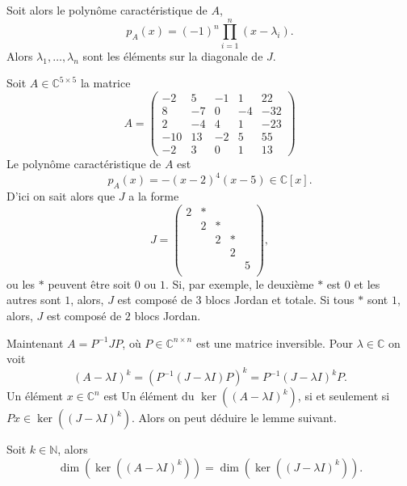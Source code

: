 \noindent 
Soit  alors le polynôme caractéristique de $A$, 
\begin{equation}
  \label{eq:57}
  p_A(x) = (-1)^n ∏_{i=1}^n (x - λ_{i}). 
\end{equation}
Alors $λ_1,\dots,λ_n$ sont les éléments sur la diagonale de $J$. 

\begin{example}
  \label{exe:52}

  Soit $A ∈ ℂ^{5 ×5}$ la matrice
  \begin{displaymath}
    A =  \left(\begin{array}{rrrrr}
-2 & 5 & -1 & 1 & 22 \\
8 & -7 & 0 & -4 & -32 \\
2 & -4 & 4 & 1 & -23 \\
-10 & 13 & -2 & 5 & 55 \\
-2 & 3 & 0 & 1 & 13
\end{array}\right)
\end{displaymath}
%
Le polynôme caractéristique de $A$ est
\begin{displaymath}
  p_A(x) = - (x-2)^4 (x-5) ∈ℂ[x]. 
\end{displaymath}
%
D'ici on sait alors que $J$ a la forme
\begin{displaymath}
  J =
  \begin{pmatrix}
    2 & *  \\
    & 2 & * \\
    & & 2 & * \\
    & & & 2   \\
    & & & & 5 \\
  \end{pmatrix}, 
\end{displaymath}
ou les $*$ peuvent être soit $0$ ou $1$. Si, par exemple, le deuxième $*$ est $0$ et les autres sont $1$, alors, $J$ est composé de $3$ blocs Jordan et totale. Si tous $*$ sont $1$, alors, $J$ est composé de $2$ blocs Jordan. 
\end{example}

Maintenant $A = P^{-1} J P$, où $P ∈ℂ^{n×n}$ est une matrice inversible.  Pour $λ ∈ ℂ$ on voit
\begin{displaymath}
  (A - λI)^k =  \left (P^{-1} (J - λ I) P \right)^k = P^{-1} (J - λ I)^k  P. 
\end{displaymath}
Un élément $x ∈ℂ^n$ est Un élément du $\ker \left((A - λI)^k\right)$, si et seulement si $P x ∈ \ker \left((J - λI)^k\right)$. Alors on peut déduire le lemme suivant.
\begin{lemma}
  \label{lem:28}
  Soit $k ∈ ℕ$, alors
  \begin{displaymath}
     \dim(\ker \left((A - λI)^k \right)) = \dim(\ker \left((J- λI)^k \right)). 
  \end{displaymath}
\end{lemma}

